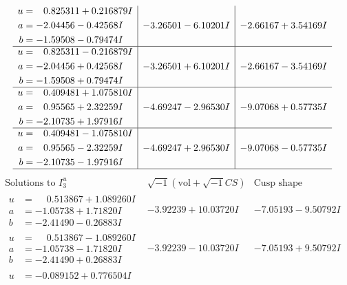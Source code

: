 \documentclass[1p]{elsarticle_modified}
\theoremstyle{definition}
\newcommand{\I}{\sqrt{-1}}
\begin{document}
$$\begin{array}{c|c|c}
\begin{aligned}
u &= \phantom{-}0.825311 + 0.216879 I \\
a &= -2.04456 - 0.42568 I \\
b &= -1.59508 - 0.79474 I\end{aligned}
 & -3.26501 - 6.10201 I & -2.66167 + 3.54169 I \\ \hline\begin{aligned}
u &= \phantom{-}0.825311 - 0.216879 I \\
a &= -2.04456 + 0.42568 I \\
b &= -1.59508 + 0.79474 I\end{aligned}
 & -3.26501 + 6.10201 I & -2.66167 - 3.54169 I \\ \hline\begin{aligned}
u &= \phantom{-}0.409481 + 1.075810 I \\
a &= \phantom{-}0.95565 + 2.32259 I \\
b &= -2.10735 + 1.97916 I\end{aligned}
 & -4.69247 - 2.96530 I & -9.07068 + 0.57735 I \\ \hline\begin{aligned}
u &= \phantom{-}0.409481 - 1.075810 I \\
a &= \phantom{-}0.95565 - 2.32259 I \\
b &= -2.10735 - 1.97916 I\end{aligned}
 & -4.69247 + 2.96530 I & -9.07068 - 0.57735 I\\
 \hline 
 \end{array}$$\newpage$$\begin{array}{c|c|c}  
\text{Solutions to }I^u_{3}& \I (\text{vol} + \sqrt{-1}CS) & \text{Cusp shape}\\
 \hline 
\begin{aligned}
u &= \phantom{-}0.513867 + 1.089260 I \\
a &= -1.05738 + 1.71820 I \\
b &= -2.41490 - 0.26883 I\end{aligned}
 & -3.92239 + 10.03720 I & -7.05193 - 9.50792 I \\ \hline\begin{aligned}
u &= \phantom{-}0.513867 - 1.089260 I \\
a &= -1.05738 - 1.71820 I \\
b &= -2.41490 + 0.26883 I\end{aligned}
 & -3.92239 - 10.03720 I & -7.05193 + 9.50792 I \\ \hline\begin{aligned}
u &= -0.089152 + 0.776504 I \\

\end{aligned}
\end{array}$$
\end{document}
